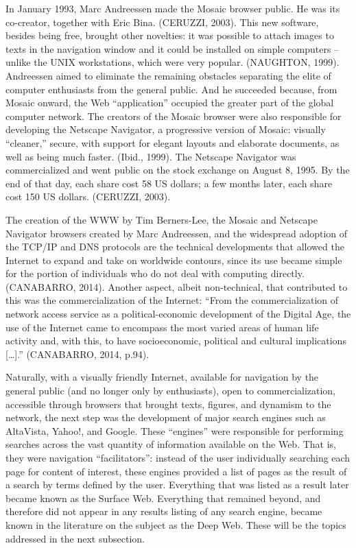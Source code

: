 In January 1993, Marc Andreessen made the Mosaic browser public. He was its co-creator, together with Eric Bina. (CERUZZI, 2003). This new software, besides being free, brought other novelties: it was possible to attach images to texts in the navigation window and it could be installed on simple computers -- unlike the UNIX workstations, which were very popular. (NAUGHTON, 1999). Andreessen aimed to eliminate the remaining obstacles separating the elite of computer enthusiasts from the general public. And he succeeded because, from Mosaic onward, the Web ``application'' occupied the greater part of the global computer network. The creators of the Mosaic browser were also responsible for developing the Netscape Navigator, a progressive version of Mosaic: visually ``cleaner,'' secure, with support for elegant layouts and elaborate documents, as well as being much faster. (Ibid., 1999). The Netscape Navigator was commercialized and went public on the stock exchange on August 8, 1995. By the end of that day, each share cost 58 US dollars; a few months later, each share cost 150 US dollars. (CERUZZI, 2003).

The creation of the WWW by Tim Berners-Lee, the Mosaic and Netscape Navigator browsers created by Marc Andreessen, and the widespread adoption of the TCP/IP and DNS protocols are the technical developments that allowed the Internet to expand and take on worldwide contours, since its use became simple for the portion of individuals who do not deal with computing directly. (CANABARRO, 2014). Another aspect, albeit non-technical, that contributed to this was the commercialization of the Internet: ``From the commercialization of network access service as a political-economic development of the Digital Age, the use of the Internet came to encompass the most varied areas of human life activity and, with this, to have socioeconomic, political and cultural implications {[}\ldots{]}.'' (CANABARRO, 2014, p.94).

Naturally, with a visually friendly Internet, available for navigation by the general public (and no longer only by enthusiasts), open to commercialization, accessible through browsers that brought texts, figures, and dynamism to the network, the next step was the development of major search engines such as AltaVista, Yahoo!, and Google. These ``engines'' were responsible for performing searches across the vast quantity of information available on the Web. That is, they were navigation ``facilitators'': instead of the user individually searching each page for content of interest, these engines provided a list of pages as the result of a search by terms defined by the user. Everything that was listed as a result later became known as the Surface Web. Everything that remained beyond, and therefore did not appear in any results listing of any search engine, became known in the literature on the subject as the Deep Web. These will be the topics addressed in the next subsection.

